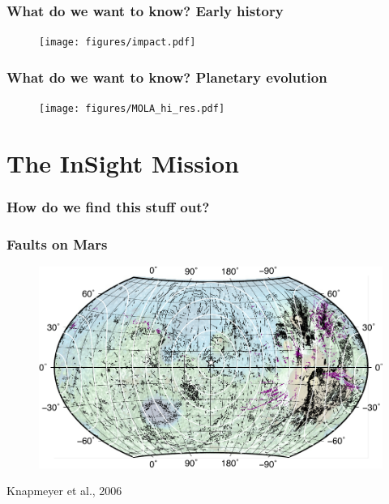 \documentclass[compress,framenumber]{beamer}
\begin{document}
\begin{frame}
  \frametitle{What do we want to know? Early history}
  \vspace{-2.0em}
  \begin{figure}
    \texttt{[image: figures/impact.pdf]}
  \end{figure}
\end{frame}

\begin{frame}
  \frametitle{What do we want to know? Planetary evolution}
  \vspace{-2.0em}
  \begin{figure}
    \texttt{[image: figures/MOLA\_hi\_res.pdf]}
  \end{figure}
\end{frame}

\section{The InSight Mission}

\begin{frame}
  \frametitle{How do we find this stuff out?}

\end{frame}

\begin{frame}
  \frametitle{Faults on Mars}
  \vspace{-2.0em}
  \begin{figure}
    \includegraphics[width=0.95\linewidth]{figures/fault_map.pdf}
  \end{figure}
\vspace{-1.0em}
\hfill Knapmeyer et al., 2006
\end{frame}
\end{document}
